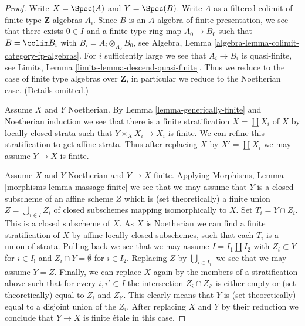 \begin{proof}
Write $X = \Spec(A)$ and $Y = \Spec(B)$. Write $A$ as a filtered colimit
of finite type $\mathbf{Z}$-algebras $A_i$. Since $B$ is an $A$-algebra of
finite presentation, we see that there exists $0 \in I$ and a
finite type ring map $A_0 \to B_0$ such that $B = \colim B_i$ with
$B_i = A_i \otimes_{A_0} B_0$, see
Algebra, Lemma \ref{algebra-lemma-colimit-category-fp-algebras}.
For $i$ sufficiently large we see that $A_i \to B_i$ is
quasi-finite, see Limits, Lemma \ref{limits-lemma-descend-quasi-finite}.
Thus we reduce to the case of finite type algebras over $\mathbf{Z}$,
in particular we reduce to the Noetherian case. (Details omitted.)

\medskip\noindent
Assume $X$ and $Y$ Noetherian.
By Lemma \ref{lemma-generically-finite}
and Noetherian induction we see that
there is a finite stratification $X = \coprod X_i$ of $X$
by locally closed strata such that $Y \times_X X_i \to X_i$ is finite.
We can refine this stratification to get affine strata.
Thus after replacing $X$ by $X' = \coprod X_i$ we may assume
$Y \to X$ is finite.

\medskip\noindent
Assume $X$ and $Y$ Noetherian and $Y \to X$ finite.
Applying Morphisms, Lemma \ref{morphisms-lemma-massage-finite}
we see that we may assume that $Y$ is a closed subscheme of an
affine scheme $Z$ which is (set theoretically) a finite union
$Z = \bigcup_{i \in I} Z_i$ of
closed subschemes mapping isomorphically to $X$.
Set $T_i = Y \cap Z_i$. This is a closed subscheme of $X$.
As $X$ is Noetherian we can find a finite stratification of $X$
by affine locally closed subschemes, such that each
$T_i$ is a union of strata. Pulling back we see that
we may assume $I = I_1 \amalg I_2$ with $Z_i \subset Y$ for
$i \in I_!$ and $Z_i \cap Y = \emptyset$ for $i \in I_2$.
Replacing $Z$ by $\bigcup_{i \in I_1}$ we see that we may assume $Y = Z$.
Finally, we can replace $X$ again by the members of a stratification
above such that for every $i, i' \subset I$ the intersection
$Z_i \cap Z_{i'}$ is either empty or (set theoretically) equal
to $Z_i$ and $Z_{i'}$. This clearly means that $Y$ is (set theoretically)
equal to a disjoint union of the $Z_i$. After replacing $X$ and
$Y$ by their reduction we conclude that $Y \to X$ is finite
\'etale in this case.
\end{proof}









